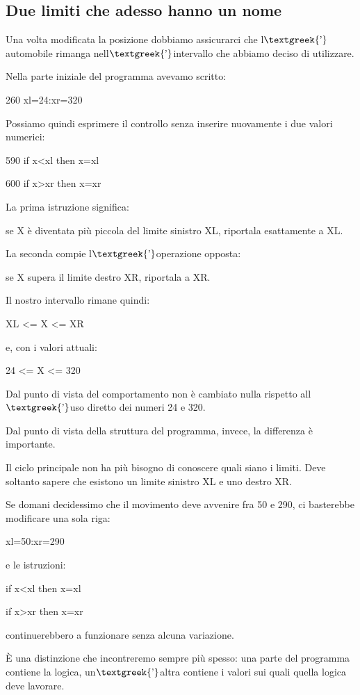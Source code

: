 \documentclass{article}
\begin{document}
\subsection{Due limiti che adesso hanno un nome}
Una volta modificata la posizione dobbiamo assicurarci che l$\text{\textgreek{’}}$automobile rimanga
nell$\text{\textgreek{’}}$intervallo che abbiamo deciso di utilizzare.

Nella parte iniziale del programma avevamo scritto:

260 xl=24:xr=320

Possiamo quindi esprimere il controllo senza inserire nuovamente i due valori numerici:

590 if x{\textless}xl then x=xl

600 if x{\textgreater}xr then x=xr

La prima istruzione significa:

se X è diventata più piccola del limite sinistro XL, riportala esattamente a XL.

La seconda compie l$\text{\textgreek{’}}$operazione opposta:

se X supera il limite destro XR, riportala a XR.

Il nostro intervallo rimane quindi:

XL {\textless}= X {\textless}= XR

e, con i valori attuali:

24 {\textless}= X {\textless}= 320

Dal punto di vista del comportamento non è cambiato nulla rispetto all$\text{\textgreek{’}}$uso diretto dei numeri 24 e
320.

Dal punto di vista della struttura del programma, invece, la differenza è importante.

Il ciclo principale non ha più bisogno di conoscere quali siano i limiti. Deve soltanto sapere che esistono un limite
sinistro XL e uno destro XR.

Se domani decidessimo che il movimento deve avvenire fra 50 e 290, ci basterebbe modificare una sola riga:

xl=50:xr=290

e le istruzioni:

if x{\textless}xl then x=xl

if x{\textgreater}xr then x=xr

continuerebbero a funzionare senza alcuna variazione.

È una distinzione che incontreremo sempre più spesso: una parte del programma contiene la logica,
un$\text{\textgreek{’}}$altra contiene i valori sui quali quella logica deve lavorare.
\end{document}
